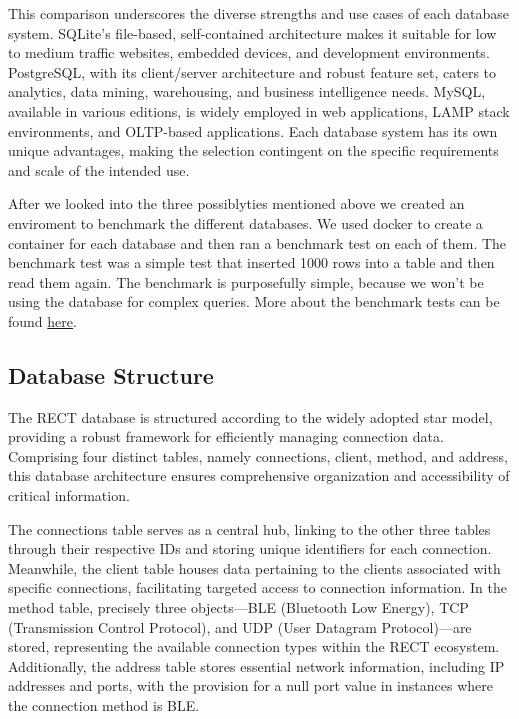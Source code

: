 This comparison underscores the diverse strengths and use cases of each database system. SQLite's file-based, self-contained architecture makes it suitable for 
low to medium traffic websites, embedded devices, and development environments. PostgreSQL, with its client/server architecture and robust feature set, caters 
to analytics, data mining, warehousing, and business intelligence needs. MySQL, available in various editions, is widely employed in web applications, LAMP 
stack environments, and OLTP-based applications. Each database system has its own unique advantages, making the selection contingent on the specific 
requirements and scale of the intended use.\newline

After we looked into the three possiblyties mentioned above we created an enviroment to benchmark the different databases. We used docker to create a container for each 
database and then ran a benchmark test on each of them. The benchmark test was a simple test that inserted 1000 rows into a table and then read them again. The benchmark is
purposefully simple, because we won't be using the database for complex queries. More about the benchmark tests can be found \href{tests.tex}{here}.

\subsection{Database Structure}
The RECT database is structured according to the widely adopted star model, providing a robust framework for efficiently managing connection data. Comprising four distinct 
tables, namely connections, client, method, and address, this database architecture ensures comprehensive organization and accessibility of critical information.\newline

The connections table serves as a central hub, linking to the other three tables through their respective IDs and storing unique identifiers for each connection. 
Meanwhile, the client table houses data pertaining to the clients associated with specific connections, facilitating targeted access to connection information. In the 
method table, precisely three objects—BLE (Bluetooth Low Energy), TCP (Transmission Control Protocol), and UDP (User Datagram Protocol)—are stored, representing the 
available connection types within the RECT ecosystem. Additionally, the address table stores essential network information, including IP addresses and ports, with the 
provision for a null port value in instances where the connection method is BLE.\newline

